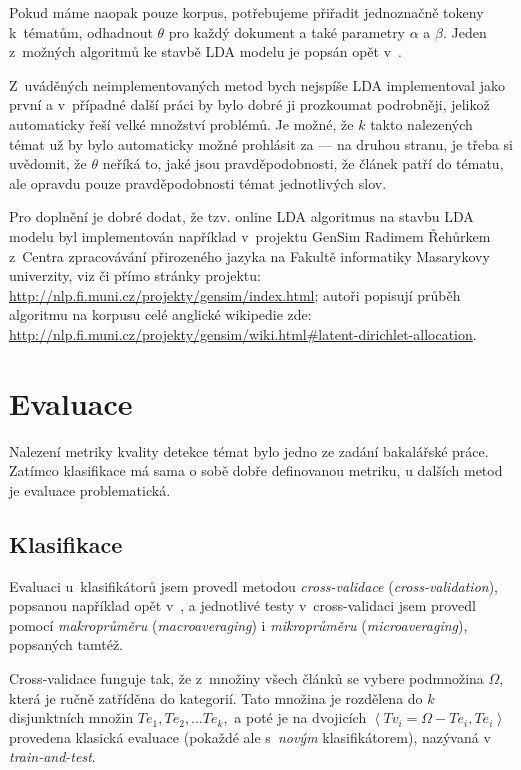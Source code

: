 \documentclass[12pt,a4paper]{report}
\begin{document}
Pokud máme naopak pouze korpus, potřebujeme přiřadit jednoznačně tokeny k~tématům, odhadnout $\theta$ pro každý dokument a také parametry $\alpha$ a $\beta$. Jeden z~možných algoritmů ke stavbě LDA modelu je popsán opět v~\cite{lda}.

Z~uváděných neimplementovaných metod bych nejspíše LDA implementoval jako první a v~případné další práci by bylo dobré ji prozkoumat podrobněji, jelikož automaticky řeší velké množství problémů. Je možné, že $k$ takto nalezených témat už by bylo automaticky možné prohlásit za  --- na druhou stranu, je třeba si uvědomit, že $\theta$ neříká to, jaké jsou pravděpodobnosti, že článek patří do tématu, ale opravdu pouze pravděpodobnosti témat jednotlivých slov.

Pro doplnění je dobré dodat, že tzv. online LDA algoritmus na stavbu LDA modelu byl implementován například v~projektu GenSim Radimem Řehůrkem z~Centra zpracovávání přirozeného jazyka na Fakultě informatiky Masarykovy univerzity, viz \cite{rehurek} či přímo stránky projektu: \url{http://nlp.fi.muni.cz/projekty/gensim/index.html}; autoři popisují průběh algoritmu na korpusu celé anglické wikipedie zde: \url{http://nlp.fi.muni.cz/projekty/gensim/wiki.html\#latent-dirichlet-allocation}.

\section{Evaluace}
\label{sec:evaluace}
Nalezení metriky kvality detekce témat bylo jedno ze zadání bakalářské práce. Zatímco klasifikace má sama o sobě dobře definovanou metriku, u dalších metod je evaluace problematická.

\subsection{Klasifikace}
\label{sec:evaluace_klasifikace}


Evaluaci u~klasifikátorů jsem provedl metodou \emph{cross-validace} (\emph{cross-va\-li\-da\-tion}), popsanou například opět v~\cite{machine_intro}, a jednotlivé testy v~cross-validaci jsem provedl pomocí \emph{makroprůměru} (\emph{macroaveraging}) i \emph{mikroprůměru} (\emph{microaveraging}), popsaných tamtéž.

Cross-validace funguje tak, že z~množiny všech článků se vybere podmnožina $\Omega$, která je ručně zatříděna do kategorií. Tato množina je rozdělena do $k$ disjunktních množin $Te_1, Te_2, \ldots Te_k,$ a poté je na dvojicích $\left<Tv_i=\Omega-Te_{i}, Te_{i}\right>$ provedena klasická evaluace (pokaždé ale s~\emph{novým} klasifikátorem), nazývaná v~\cite{machine_intro} \emph{train-and-test}.
\end{document}
